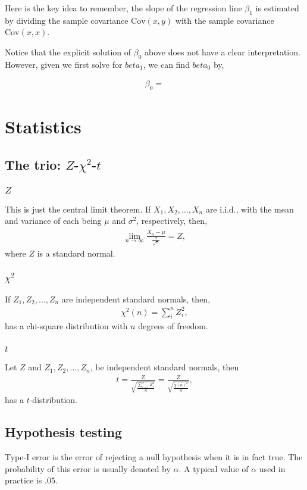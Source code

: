 \documentclass{amsart}
\theoremstyle{plain}
\numberwithin{equation}{section}
\begin{document}
Here is the key idea to remember, the slope of the regression line $\beta_1$ 
is estimated by dividing the sample covariance $\mathrm{Cov}(x,y)$ with the 
sample covariance $\mathrm{Cov}(x, x)$.

Notice that the explicit solution of $\beta_0$ above does not 
have a clear interpretation. However, given we first solve for 
$beta_1$, we can find $beta_0$ by,

\begin{align*}
\beta_0 = 
\end{align*}

\section{Statistics}

\subsection{The trio: $Z$-$\chi^2$-$t$}
\subsubsection{$Z$}
This is just the central limit theorem. If 
$X_1, X_2, \ldots, X_n$ are i.i.d., with the 
mean and variance of each being $\mu$ and 
$\sigma^2$, respectively, then,
\begin{align*}
\lim_{n \to \infty} \frac{\overline{X}_n-\mu}{\frac{\sigma}{\sqrt{n}}} = Z,
\end{align*}
where $Z$ is a standard normal. 
\subsubsection{$\chi^2$}
If $Z_1, Z_2, \ldots, Z_n$ are independent standard normals,
then, 
\begin{align*}
\chi^2(n) = \sum_{i}^{n} Z_i ^2,
\end{align*}
has a chi-square distribution with $n$ degrees of freedom.

\subsubsection{$t$}
Let $Z$ and $Z_1, Z_2, \ldots, Z_n$, be independent
standard normals, then
\begin{align*}
t = \frac{Z}{\sqrt{\frac{\sum_{i=1}^{n} Z_i ^2}{n}}}
= \frac{Z}{\sqrt{\frac{\chi(n)^2}{n}}},
\end{align*}
has a $t$-distribution. 

\subsection{Hypothesis testing}
Type-I error is the error of 
rejecting a null hypothesis when it 
is in fact true. The probability of this error
is usually denoted by $\alpha$. A typical 
value of $\alpha$ used in practice is 
$.05$.
\end{document}
